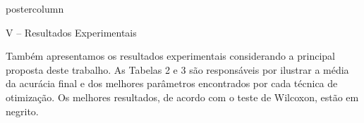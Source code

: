 \documentclass[final,hyperref={pdfpagelabels=false}]{beamer}
\begin{document}
\begin{frame}
\begin{columns}
\begin{column}{.54\textwidth}
\begin{beamercolorbox}[center,wd=\textwidth]{postercolumn}
\begin{minipage}[T]{.95\textwidth}
{\begin{block}{\vspace*{-7pt} \large V -- Resultados Experimentais}
	    {\small \begin{table}[h]
		\centering
		\caption{\footnotesize Intervalo dos parâmetros utilizados.}
		\label{t.parameters}
		\end{table}}
		
		\begin{itemize}
		
		{\small \item Também apresentamos os resultados experimentais considerando a principal proposta deste trabalho. As Tabelas 2 e 3 são responsáveis por ilustrar a média da acurácia final e dos melhores parâmetros encontrados por cada técnica de otimização. Os melhores resultados, de acordo com o teste de Wilcoxon, estão em negrito.}
			
		\end{itemize}
		
		\vspace*{14pt}
	

\end{block}}
\end{minipage}
\end{beamercolorbox}
\end{column}
\end{columns}
\end{frame}
\end{document}
